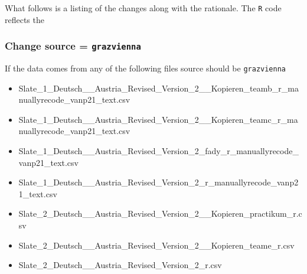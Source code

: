 \documentclass[]{article}
\newenvironment{Shaded}{\begin{snugshade}}{\end{snugshade}}
\newcommand{\KeywordTok}[1]{\textcolor[rgb]{0.94,0.87,0.69}{{#1}}}
\newcommand{\DataTypeTok}[1]{\textcolor[rgb]{0.87,0.87,0.75}{{#1}}}
\newcommand{\StringTok}[1]{\textcolor[rgb]{0.80,0.58,0.58}{{#1}}}
\newcommand{\CommentTok}[1]{\textcolor[rgb]{0.50,0.62,0.50}{{#1}}}
\newcommand{\NormalTok}[1]{\textcolor[rgb]{0.80,0.80,0.80}{{#1}}}
\begin{document}
\begin{Shaded}
\end{Shaded}

What follows is a listing of the changes along with the rationale. The
\texttt{R} code reflects the

\subsubsection{\textbf{Change} source =
\texttt{grazvienna}}\label{change-source-grazvienna}

If the data comes from any of the following files source should be
\texttt{grazvienna}

\begin{itemize}
\itemsep1pt\parskip0pt
\item
  Slate\_1\_Deutsch\_\_Austria\_Revised\_Version\_2\_\_Kopieren\_teamb\_r\_manuallyrecode\_vanp21\_text.csv
\item
  Slate\_1\_Deutsch\_\_Austria\_Revised\_Version\_2\_\_Kopieren\_teamc\_r\_manuallyrecode\_vanp21\_text.csv
\item
  Slate\_1\_Deutsch\_\_Austria\_Revised\_Version\_2\_fady\_r\_manuallyrecode\_vanp21\_text.csv
\item
  Slate\_1\_Deutsch\_\_Austria\_Revised\_Version\_2\_r\_manuallyrecode\_vanp21\_text.csv
\item
  Slate\_2\_Deutsch\_\_Austria\_Revised\_Version\_2\_\_Kopieren\_practikum\_r.csv
\item
  Slate\_2\_Deutsch\_\_Austria\_Revised\_Version\_2\_\_Kopieren\_teame\_r.csv
\item
  Slate\_2\_Deutsch\_\_Austria\_Revised\_Version\_2\_r.csv
\end{itemize}
\end{document}
